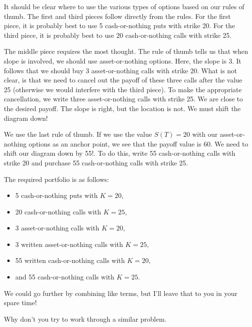 \documentclass{ximera}
\begin{document}
\begin{solution}
It should be clear where to use the various types of options based on our rules of thumb. The first and third pieces follow directly from the rules. For the first piece, it is probably best to use 5 cash-or-nothing puts with strike 20. For the third piece, it is probably best to use 20 cash-or-nothing calls with strike 25. 

The middle piece requires the most thought. The rule of thumb tells us that when slope is involved, we should use asset-or-nothing options. Here, the slope is 3. It follows that we should buy 3 asset-or-nothing calls with strike 20. What is not clear, is that we need to cancel out the payoff of these three calls after the value 25 (otherwise we would interfere with the third piece). To make the appropriate cancellation, we write three asset-or-nothing calls with strike 25. We are close to the desired payoff. The slope is right, but the location is not. We must shift the diagram down!

We use the last rule of thumb. If we use the value $S(T)=20$ with our asset-or-nothing options as an anchor point, we see that the payoff value is $60$. We need to shift our diagram down by 55!. To do this, write 55 cash-or-nothing calls with strike 20 and purchase 55 cash-or-nothing calls with strike 25.

The required portfolio is as follows:
\begin{itemize}
\item 5 cash-or-nothing puts with $K=20$,
\item 20 cash-or-nothing calls with $K=25$,
\item 3 asset-or-nothing calls with $K=20$,
\item 3 written asset-or-nothing calls with $K=25$,
\item 55 written cash-or-nothing calls with $K=20$,
\item and 55 cash-or-nothing calls with $K=25$.
\end{itemize}
We could go further by combining like terms, but I'll leave that to you in your spare time!

\end{solution}

Why don't you try to work through a similar problem.
\end{document}

